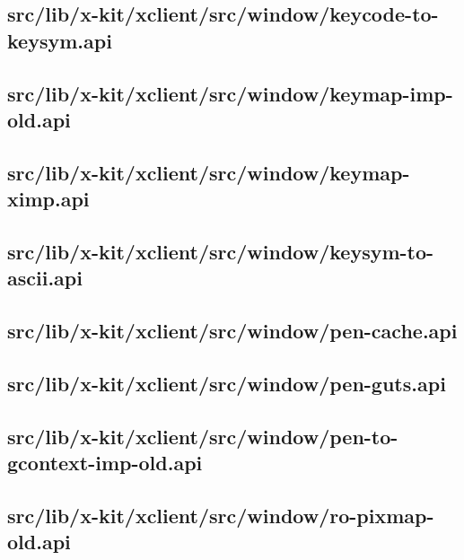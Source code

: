 \subsection{src/lib/x-kit/xclient/src/window/keycode-to-keysym.api}


\subsection{src/lib/x-kit/xclient/src/window/keymap-imp-old.api}


\subsection{src/lib/x-kit/xclient/src/window/keymap-ximp.api}


\subsection{src/lib/x-kit/xclient/src/window/keysym-to-ascii.api}


\subsection{src/lib/x-kit/xclient/src/window/pen-cache.api}


\subsection{src/lib/x-kit/xclient/src/window/pen-guts.api}


\subsection{src/lib/x-kit/xclient/src/window/pen-to-gcontext-imp-old.api}


\subsection{src/lib/x-kit/xclient/src/window/ro-pixmap-old.api}


